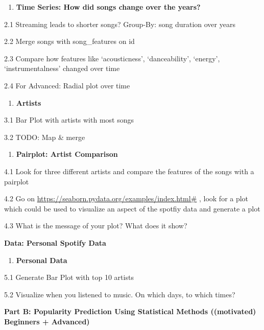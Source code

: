 \documentclass[
  11pt,
]{book}
\providecommand{\tightlist}{%
  \setlength{\itemsep}{0pt}\setlength{\parskip}{0pt}}
\begin{document}
\begin{enumerate}
\def\labelenumi{\arabic{enumi}.}
\setcounter{enumi}{1}
\tightlist
\item
  \textbf{Time Series: How did songs change over the years?}
\end{enumerate}

2.1 Streaming leads to shorter songs? Group-By: song duration over years

2.2 Merge songs with song\_features on id

2.3 Compare how features like `acousticness', `danceability', `energy', `instrumentalness' changed over time

2.4 For Advanced: Radial plot over time

\begin{enumerate}
\def\labelenumi{\arabic{enumi}.}
\setcounter{enumi}{2}
\tightlist
\item
  \textbf{Artists}
\end{enumerate}

3.1 Bar Plot with artists with most songs

3.2 TODO: Map \& merge

\begin{enumerate}
\def\labelenumi{\arabic{enumi}.}
\setcounter{enumi}{3}
\tightlist
\item
  \textbf{Pairplot: Artist Comparison}
\end{enumerate}

4.1 Look for three different artists and compare the features of the songs with a pairplot

4.2 Go on \url{https://seaborn.pydata.org/examples/index.html\#} , look for a plot which could be used to visualize an aspect of the spotfiy data and generate a plot

4.3 What is the message of your plot? What does it show?

\textbf{Data: Personal Spotify Data}

\begin{enumerate}
\def\labelenumi{\arabic{enumi}.}
\setcounter{enumi}{4}
\tightlist
\item
  \textbf{Personal Data}
\end{enumerate}

5.1 Generate Bar Plot with top 10 artists

5.2 Visualize when you listened to music. On which days, to which times?

\textbf{Part B: Popularity Prediction Using Statistical Methods ((motivated) Beginners + Advanced)}
\end{document}
